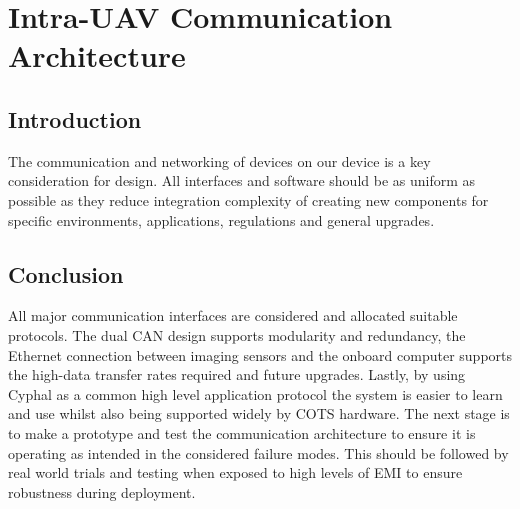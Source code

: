 \newpage
{}
\section{Intra-UAV Communication Architecture} \label{Intra Communication}

\subsection{Introduction}\label{sub_section:tgt_intra_com_intro}
The communication and networking of devices on our device is a key consideration for design. All interfaces and software should be as uniform as possible as they reduce integration complexity of creating new components for specific environments, applications, regulations and general upgrades.



\subsection{Conclusion}
All major communication interfaces are considered and allocated suitable protocols. The dual \gls{CAN} design supports modularity and redundancy, the Ethernet connection between imaging sensors and the onboard computer supports the high-data transfer rates required and future upgrades. Lastly, by using Cyphal as a common high level application protocol the system is easier to learn and use whilst also being supported widely by \gls{COTS} hardware. The next stage is to make a prototype and test the communication architecture to ensure it is operating as intended in the considered failure modes. This should be followed by real world trials and testing when exposed to high levels of \gls{EMI} to ensure robustness during deployment.